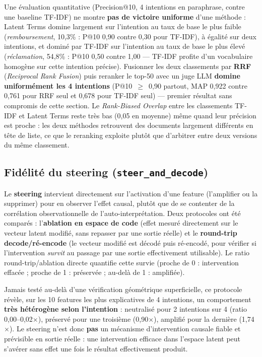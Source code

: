 \documentclass[11pt]{article}
\begin{document}
Une évaluation quantitative (Precision@10, 4 intentions en paraphrase, contre
une baseline TF-IDF) ne montre \textbf{pas de victoire uniforme} d'une
méthode : Latent Terms domine largement sur l'intention au taux de base le
plus faible (\emph{remboursement}, 10,3\% : P@10 0,90 contre 0,30 pour
TF-IDF), à égalité sur deux intentions, et dominé par TF-IDF sur l'intention
au taux de base le plus élevé (\emph{réclamation}, 54,8\% : P@10 0,50 contre
1,00 --- TF-IDF profite d'un vocabulaire homogène sur cette intention
précise). Fusionner les deux classements par \textbf{RRF} (\emph{Reciprocal
Rank Fusion}) puis reranker le top-50 avec un juge LLM \textbf{domine
uniformément les 4 intentions} (P@10~$\geq$~0,90 partout, MAP 0,922 contre
0,761 pour RRF seul et 0,678 pour TF-IDF seul) --- premier résultat sans
compromis de cette section. Le \emph{Rank-Biased Overlap} entre les
classements TF-IDF et Latent Terms reste très bas (0,05 en moyenne) même
quand leur précision est proche : les deux méthodes retrouvent des documents
largement différents en tête de liste, ce que le reranking exploite plutôt
que d'arbitrer entre deux versions du même classement.

\subsection{Fidélité du steering (\texttt{steer\_and\_decode})}

Le \textbf{steering} intervient directement sur l'activation d'une feature
(l'amplifier ou la supprimer) pour en observer l'effet causal, plutôt que de
se contenter de la corrélation observationnelle de l'auto-interprétation.
Deux protocoles ont été comparés : l'\textbf{ablation en espace de code}
(effet mesuré directement sur le vecteur latent modifié, sans repasser par
une sortie réelle) et le \textbf{round-trip decode/ré-encode} (le vecteur
modifié est décodé puis ré-encodé, pour vérifier si l'intervention
\emph{survit} au passage par une sortie effectivement utilisable). Le ratio
round-trip/ablation directe quantifie cette survie (proche de 0 : intervention
effacée ; proche de 1 : préservée ; au-delà de 1 : amplifiée).

Jamais testé au-delà d'une vérification géométrique superficielle, ce
protocole révèle, sur les 10 features les plus explicatives de 4 intentions,
un comportement \textbf{très hétérogène selon l'intention} : neutralisé pour
2 intentions sur 4 (ratio 0,00--0,02$\times$), préservé pour une troisième
(0,90$\times$), amplifié pour la dernière (1,74$\times$). Le steering n'est
donc \textbf{pas} un mécanisme d'intervention causale fiable et prévisible en
sortie réelle : une intervention efficace dans l'espace latent peut s'avérer
sans effet une fois le résultat effectivement produit.
\end{document}
